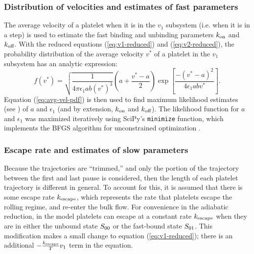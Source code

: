 \documentclass{biophys-new}
\begin{document}
\subsubsection*{Distribution of velocities and estimates of fast
  parameters}

The average velocity of a platelet when it is in the $v_1$ subsystem
(i.e. when it is in a step) is used to estimate the fast binding and
unbinding parameters $k_\textnormal{on}$ and $k_\textnormal{off}$. With the reduced
equations (\ref{eq:v1-reduced}) and (\ref{eq:v2-reduced}), the
probability distribution of the average velocity $v^*$ of a platelet
in the $v_1$ subsystem has an analytic expression:
\begin{equation}
  \label{eq:avg-vel-pdf}
  f\left(v^*\right) = \sqrt{\frac{1}{4\pi \epsilon_1 a b
      \left(v^*\right)^3}} \left(a + \frac{v^* - a}{2}\right)
  \exp\left[\frac{-\left(v^* - a\right)^2}{4\epsilon_1 a b v^*}\right].
\end{equation}
Equation (\ref{eq:avg-vel-pdf}) is then used to find maximum
likelihood estimates (see \cite{Bain1992}) of $a$ and $\epsilon_1$
(and by extension, $k_\textnormal{on}$ and $k_\textnormal{off}$). The likelihood
function for $a$ and $\epsilon_1$ was maximized iteratively using
SciPy's \cite{Virtanen2020} \verb|minimize| function, which implements
the BFGS algorithm for unconstrained optimization
\cite{Nocedal2006}.

\subsubsection*{Escape rate and estimates of slow parameters}

Because the trajectories are ``trimmed,'' and only the portion of the
trajectory between the first and last pause is considered, then the
length of each platelet trajectory is different in general. To account
for this, it is assumed that there is some escape rate $k_\textnormal{escape}$,
which represents the rate that platelets escape the rolling regime,
and re-enter the bulk flow. For convenience in the adiabatic
reduction, in the model platelets can escape at a constant rate
$k_\textnormal{escape}$ when they are in either the unbound state $S_{00}$
or the fast-bound state $S_{01}$. This modification makes a
small change to equation (\ref{eq:v1-reduced}); there is an additional
$- \frac{k_\textnormal{escape}}{T} v_1$ term in the equation.
\end{document}

